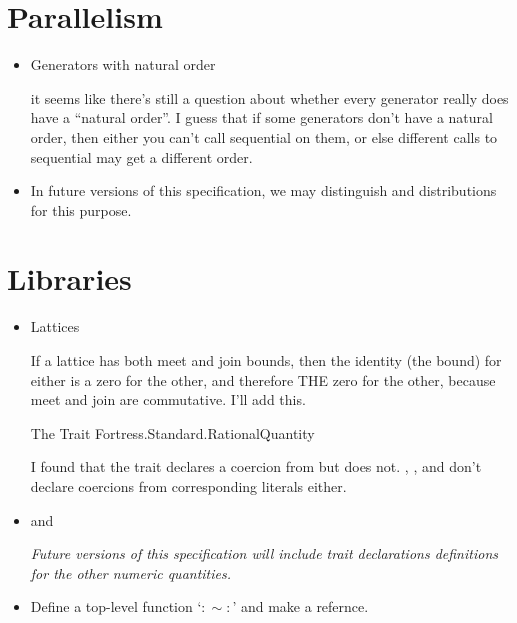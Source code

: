 \section{Parallelism}
\begin{itemize}
\item Generators with natural order

it seems like there's still a question about whether every generator really does have a ``natural order''.  I guess that if some generators don't have a natural order, then either you can't call sequential on them, or else different calls to sequential may get a different order.

\item {}

In future versions of this specification, we may
distinguish  and  distributions for this
purpose.
\end{itemize}

\section{Libraries}
\begin{itemize}
\item %
Lattices

If a lattice has both meet and join bounds, then the
identity (the bound) for either is a zero for the other, and therefore
THE zero for the other, because meet and join are commutative.
I'll add this.

 The Trait Fortress.Standard.RationalQuantity

I found that the trait  declares a coercion from
 but  does not.
, , and  don't
declare coercions from corresponding literals either.

\item {} and 

\emph{Future versions of this specification will include trait declarations
  definitions for the other numeric quantities.}

  \item Define a top-level function `$:\sim:$' and make a refernce.
\end{itemize}

